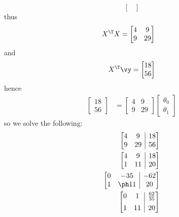 \documentclass[189]{pset}
\makeatletter
\newenvironment{amatrix}[1]{%
  \left[\begin{array}{@{}*{#1}{c}|c@{}}
}{%
  \end{array}\right]
}
\makeatother
\begin{document}
\begin{enumerate}
\[\begin{bmatrix}
        \end{bmatrix}
      \]
      thus
      \begin{align*}
        X^\T X
        &=
          \begin{bmatrix}
            4 & 9 \\
            9 & 29
          \end{bmatrix}
      \end{align*}
      and
      \[
        X^\T \vy =
        \begin{bmatrix}
          18 \\
          56
        \end{bmatrix}
      \]
      hence
      \begin{align*}
        \begin{bmatrix}
          18 \\
          56
        \end{bmatrix}
        &=
          \begin{bmatrix}
            4 & 9 \\
            9 & 29
          \end{bmatrix}
                \begin{bmatrix}
                  \theta_0 \\
                  \theta_1
                \end{bmatrix}
      \end{align*}
      so we solve the following:
      \begin{align*}
        \begin{amatrix}{2}
          4 & 9 & 18 \\
          9 & 29 & 56
        \end{amatrix} \\
        \begin{amatrix}{2}
          4 & 9 & 18 \\
          1 & 11 & 20
        \end{amatrix} \\
        \begin{amatrix}{2}
          0 & -35 & -62 \\
          1 & \ph 11 & 20
        \end{amatrix}\\
        \begin{amatrix}{2}
          0 & 1 & \frac{62}{35} \\[.5em]
          1 & 11 & 20
        \end{amatrix}\\

\end{align*}
\end{enumerate}
\end{document}
